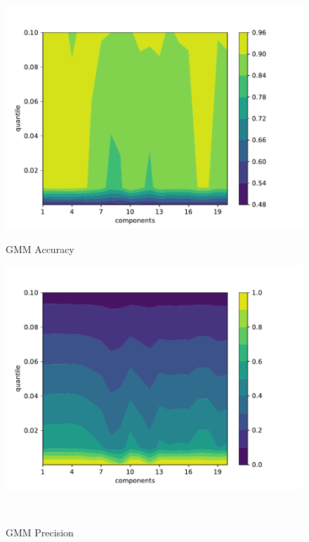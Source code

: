 \begin{figure}[!htb] %
    \begin{minipage}[t]{0.5\textwidth}
        \vspace{0pt}
        \includegraphics[width=\textwidth]{images/gmm-accuracy.pdf}
        \caption{GMM Accuracy}
    \end{minipage}
    \hfill
    \begin{minipage}[t]{0.5\textwidth}
        \vspace{0pt}
        \includegraphics[width=\textwidth]{images/gmm-precision.pdf}
        \caption{GMM Precision}
    \end{minipage}
    \\

\end{figure}
